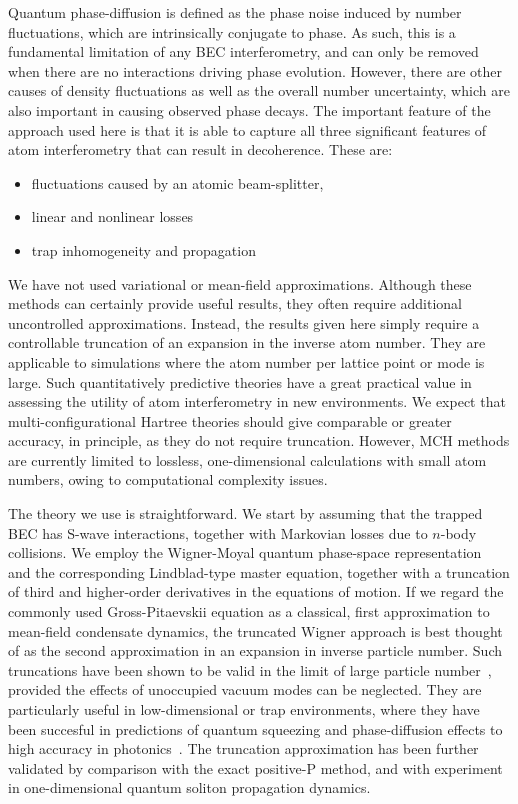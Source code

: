 \documentclass[aps,prl,twocolumn,showpacs,amsmath,amssymb,superscriptaddress]{revtex4-1}
\begin{document}
{Quantum phase-diffusion is defined as the phase noise induced by number fluctuations,
which are intrinsically conjugate to phase.
As such, this is a fundamental limitation of any BEC interferometry,
and can only be removed when there are no interactions driving phase evolution.
However, there are other causes of density fluctuations as well as the overall number uncertainty,
which are also important in causing observed phase decays.
The important feature of the approach used here is that it is able to capture
all three significant features of atom interferometry that can result in decoherence.
These are:
\begin{itemize}
\item fluctuations caused by an atomic beam-splitter,
\item linear and nonlinear losses
\item trap inhomogeneity and propagation
\end{itemize}
We have not used variational or mean-field approximations.
Although these methods can certainly provide useful results,
they often require additional uncontrolled approximations.
Instead, the results given here simply require a controllable truncation
of an expansion in the inverse atom number.
They are applicable to simulations where the atom number per lattice point or mode is large.
Such quantitatively predictive theories have a great practical value
in assessing the utility of atom interferometry in new environments.
We expect that multi-configurational Hartree theories should give comparable or greater accuracy,
in principle, as they do not require truncation.
However, MCH methods are currently limited to lossless,
one-dimensional calculations with small atom numbers,
owing to computational complexity issues.

The theory we use is straightforward.
We start by assuming that the trapped BEC has S-wave interactions,
together with Markovian losses due to $n$-body collisions.
We employ the Wigner-Moyal quantum phase-space representation~\cite{Gardiner2004}
and the corresponding Lindblad-type master equation,
together with a truncation of third and higher-order derivatives in the equations of motion.
If we regard the commonly used Gross-Pitaevskii equation as a classical,
first approximation to mean-field condensate dynamics,
the truncated Wigner approach is best thought of as the second approximation
in an expansion in inverse particle number.
Such truncations have been shown to be valid in the limit of large particle number~\cite{Sinatra2002},
provided the effects of unoccupied vacuum modes can be neglected.
They are particularly useful in low-dimensional or trap environments,
where they have been succesful in predictions of quantum squeezing
and phase-diffusion effects to high accuracy in photonics~\cite{Corney2008}.
The truncation approximation has been further validated by comparison
with the exact positive-P method,
and with experiment in one-dimensional quantum soliton propagation dynamics.

}
\end{document}
